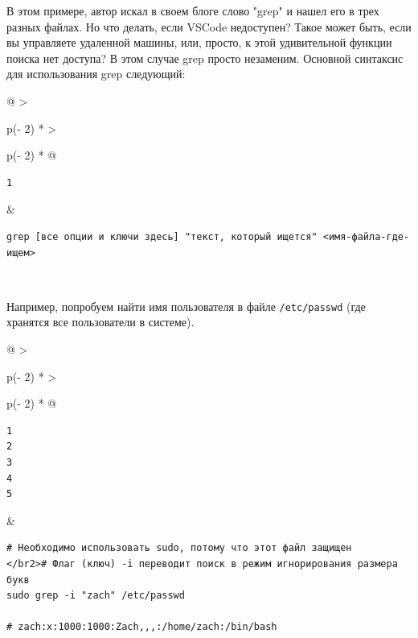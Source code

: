 \documentclass{article}
\begin{document}
В этом примере, автор искал в своем блоге слово "grep" и нашел его в
трех разных файлах. Но что делать, если VSCode недоступен? Такое может
быть, если вы управляете удаленной машины, или, просто, к этой
удивительной функции поиска нет доступа? В этом случае grep просто
незаменим. Основной синтаксис для использования grep следующий:

\begin{longtable}[]{@{}
  >{\raggedright\arraybackslash}p{(\columnwidth - 2\tabcolsep) * }
  >{\raggedright\arraybackslash}p{(\columnwidth - 2\tabcolsep) * }@{}}
\toprule
\endhead
\begin{minipage}[t]{\linewidth}\raggedright
\begin{verbatim}
1
\end{verbatim}
\end{minipage} & \begin{minipage}[t]{\linewidth}\raggedright
\begin{verbatim}
grep [все опции и ключи здесь] "текст, который ищется" <имя-файла-где-ищем>
\end{verbatim}
\end{minipage} \\ \addlinespace
\bottomrule
\end{longtable}

Например, попробуем найти имя пользователя в файле \texttt{/etc/passwd}
(где хранятся все пользователи в системе).

\begin{longtable}[]{@{}
  >{\raggedright\arraybackslash}p{(\columnwidth - 2\tabcolsep) * }
  >{\raggedright\arraybackslash}p{(\columnwidth - 2\tabcolsep) * }@{}}
\toprule
\endhead
\begin{minipage}[t]{\linewidth}\raggedright
\begin{verbatim}
1
2
3
4
5
\end{verbatim}
\end{minipage} & \begin{minipage}[t]{\linewidth}\raggedright
\begin{verbatim}
# Необходимо использовать sudo, потому что этот файл защищен
</br2># Флаг (ключ) -i переводит поиск в режим игнорирования размера букв
sudo grep -i "zach" /etc/passwd

# zach:x:1000:1000:Zach,,,:/home/zach:/bin/bash
\end{verbatim}
\end{minipage} \\ \addlinespace
\bottomrule
\end{longtable}
\end{document}
